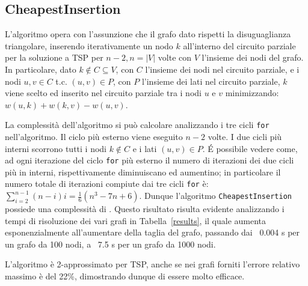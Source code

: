 \subsection{CheapestInsertion}

L'algoritmo opera con l'assunzione che il grafo dato rispetti la disuguaglianza triangolare, inserendo iterativamente un nodo $k$ all'interno del circuito parziale per la soluzione a TSP per $n-2, n=|V|$ volte con $V$ l'insieme dei nodi del grafo. In particolare, dato $k \notin C \subseteq V$, con $C$ l'insieme dei nodi nel circuito parziale, e i nodi $u,v \in C$ \mbox{t.c.} $(u,v)\in P$, con $P$ l'insieme dei lati nel circuito parziale, $k$ viene scelto ed inserito nel circuito parziale tra i nodi $u$ e $v$ minimizzando: $w(u,k)+w(k,v)-w(u,v)$.

La complessità dell'algoritmo si può calcolare analizzando i tre cicli \texttt{for} nell'algoritmo. Il ciclo più esterno viene eseguito $n-2$ volte. I due cicli più interni scorrono tutti i nodi $k \notin C$ e i lati $(u,v)\in P$. \'E possibile vedere come, ad ogni iterazione del ciclo \texttt{for} più esterno il numero di iterazioni dei due cicli più in interni, rispettivamente diminuiscano ed aumentino; in particolare il numero totale di iterazioni compiute dai tre cicli \texttt{for} è: $\sum_{i=2}^{n-1} (n-i)i=\frac{1}{6}(n^3-7n+6)$. Dunque l'algoritmo \texttt{CheapestInsertion} possiede una complessità di .
Questo risultato risulta evidente analizzando i tempi di risoluzione dei vari grafi in Tabella~\ref{results}, il quale aumenta esponenzialmente all'aumentare della taglia del grafo, passando dai ~0.004 s per un grafo da 100 nodi, a ~7.5 s per un grafo da 1000 nodi.

L'algoritmo è 2-approssimato per TSP, anche se nei grafi forniti l'errore relativo massimo è del 22\%, dimostrando dunque di essere molto efficace.